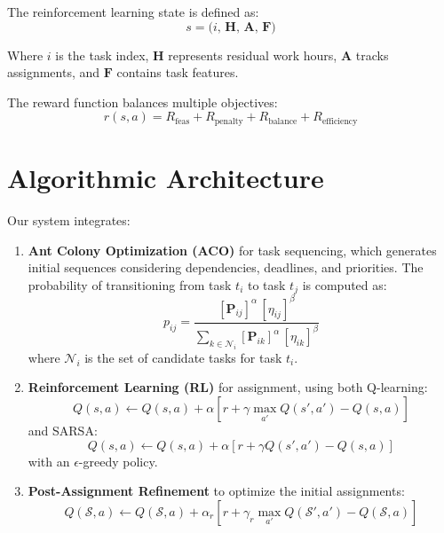 \documentclass[12pt]{article}
\begin{document}
	The reinforcement learning state is defined as:
	\begin{equation}
		s = \bigl(i,\,\mathbf{H},\,\mathbf{A},\,\mathbf{F}\bigr)
	\end{equation}
	
	Where $i$ is the task index, $\mathbf{H}$ represents residual work hours, $\mathbf{A}$ tracks assignments, and $\mathbf{F}$ contains task features.
	
	The reward function balances multiple objectives:
	\begin{equation}
		r(s,a) = R_{\text{feas}} + R_{\text{penalty}} + R_{\text{balance}} + R_{\text{efficiency}}
	\end{equation}
	
	\section{\label{sec:algo}Algorithmic Architecture}
	
	Our system integrates:
	
	\begin{enumerate}
		\item \textbf{Ant Colony Optimization (ACO)} for task sequencing, which generates initial sequences considering dependencies, deadlines, and priorities. The probability of transitioning from task $t_i$ to task $t_j$ is computed as:
		\begin{equation}
			p_{ij} = \frac{[\mathbf{P}_{ij}]^{\alpha} \,[\eta_{ij}]^{\beta}}{\sum_{k \in \mathcal{N}_i}[\mathbf{P}_{ik}]^{\alpha} \,[\eta_{ik}]^{\beta}}
		\end{equation}
		where $\mathcal{N}_i$ is the set of candidate tasks for task $t_i$.
		
		\item \textbf{Reinforcement Learning (RL)} for assignment, using both Q-learning:
		\begin{equation}
			Q(s,a) \leftarrow Q(s,a) + \alpha \left[r + \gamma \max_{a'} Q(s',a') - Q(s,a)\right]
		\end{equation}
		and SARSA:
		\begin{equation}
			Q(s,a) \leftarrow Q(s,a) + \alpha \left[r + \gamma Q(s',a') - Q(s,a)\right]
		\end{equation}
		with an $\epsilon$-greedy policy.
		
		\item \textbf{Post-Assignment Refinement} to optimize the initial assignments:
		\begin{equation}
			Q(\mathcal{S},a) \leftarrow Q(\mathcal{S},a) + \alpha_r \left[r + \gamma_r \max_{a'} Q(\mathcal{S}',a') - Q(\mathcal{S},a)\right]
		\end{equation}
	\end{enumerate}
	
\end{document}
